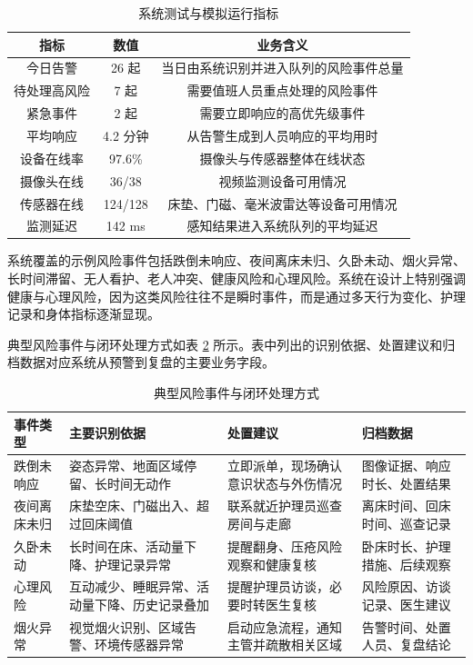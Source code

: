 \documentclass[UTF8,a4paper,zihao=-4,fontset=fandol]{ctexart}
\begin{document}
\begin{table}[htbp]
  \centering
  \caption{系统测试与模拟运行指标}
  \label{tab:runtime-data}
  \begin{tabular}{ccc}
    \toprule
    指标 & 数值 & 业务含义 \\
    \midrule
    今日告警 & 26 起 & 当日由系统识别并进入队列的风险事件总量 \\
    待处理高风险 & 7 起 & 需要值班人员重点处理的风险事件 \\
    紧急事件 & 2 起 & 需要立即响应的高优先级事件 \\
    平均响应 & 4.2 分钟 & 从告警生成到人员响应的平均用时 \\
    设备在线率 & 97.6\% & 摄像头与传感器整体在线状态 \\
    摄像头在线 & 36/38 & 视频监测设备可用情况 \\
    传感器在线 & 124/128 & 床垫、门磁、毫米波雷达等设备可用情况 \\
    监测延迟 & 142 ms & 感知结果进入系统队列的平均延迟 \\
    \bottomrule
  \end{tabular}
\end{table}

系统覆盖的示例风险事件包括跌倒未响应、夜间离床未归、久卧未动、烟火异常、长时间滞留、无人看护、老人冲突、健康风险和心理风险。系统在设计上特别强调健康与心理风险，因为这类风险往往不是瞬时事件，而是通过多天行为变化、护理记录和身体指标逐渐显现。

典型风险事件与闭环处理方式如表 \ref{tab:event-closed-loop} 所示。表中列出的识别依据、处置建议和归档数据对应系统从预警到复盘的主要业务字段。

\begin{table}[htbp]
  \centering
  \caption{典型风险事件与闭环处理方式}
  \label{tab:event-closed-loop}
  \begin{tabularx}{\textwidth}{>{\centering\arraybackslash}p{3.0cm}>{\centering\arraybackslash}p{3.5cm}>{\centering\arraybackslash}X>{\centering\arraybackslash}p{3.1cm}}
    \toprule
    事件类型 & 主要识别依据 & 处置建议 & 归档数据 \\
    \midrule
    跌倒未响应 & 姿态异常、地面区域停留、长时间无动作 & 立即派单，现场确认意识状态与外伤情况 & 图像证据、响应时长、处置结果 \\
    夜间离床未归 & 床垫空床、门磁出入、超过回床阈值 & 联系就近护理员巡查房间与走廊 & 离床时间、回床时间、巡查记录 \\
    久卧未动 & 长时间在床、活动量下降、护理记录异常 & 提醒翻身、压疮风险观察和健康复核 & 卧床时长、护理措施、后续观察 \\
    心理风险 & 互动减少、睡眠异常、活动量下降、历史记录叠加 & 提醒护理员访谈，必要时转医生复核 & 风险原因、访谈记录、医生建议 \\
    烟火异常 & 视觉烟火识别、区域告警、环境传感器异常 & 启动应急流程，通知主管并疏散相关区域 & 告警时间、处置人员、复盘结论 \\
    \bottomrule
  \end{tabularx}
\end{table}
\end{document}
